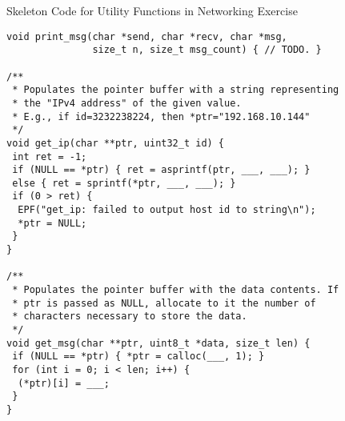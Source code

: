 \begin{cl}[network.c]{Skeleton Code for Utility Functions in Networking Exercise}
\begin{lstlisting}[language=MyC]
void print_msg(char *send, char *recv, char *msg, 
               size_t n, size_t msg_count) { // TODO. }

/**
 * Populates the pointer buffer with a string representing
 * the "IPv4 address" of the given value.
 * E.g., if id=3232238224, then *ptr="192.168.10.144"
 */
void get_ip(char **ptr, uint32_t id) {
 int ret = -1;
 if (NULL == *ptr) { ret = asprintf(ptr, ___, ___); } 
 else { ret = sprintf(*ptr, ___, ___); }
 if (0 > ret) {
  EPF("get_ip: failed to output host id to string\n");
  *ptr = NULL;
 }
}

/**
 * Populates the pointer buffer with the data contents. If
 * ptr is passed as NULL, allocate to it the number of 
 * characters necessary to store the data.
 */
void get_msg(char **ptr, uint8_t *data, size_t len) {
 if (NULL == *ptr) { *ptr = calloc(___, 1); }
 for (int i = 0; i < len; i++) {
  (*ptr)[i] = ___;
 }
}
\end{lstlisting}
\end{cl}


